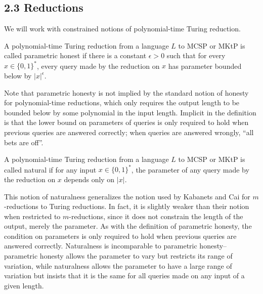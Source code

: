 \subsection*{2.3 Reductions}
We will work with constrained notions of polynomial-time Turing reduction.
\begin{ntdefinition}
A polynomial-time Turing reduction from a language $L$ to MCSP or MKtP is called parametric honest if there is a constant $\epsilon>0$ such that for every $x\in\{0,1\}^*$, every query made by the reduction on $x$ has parameter bounded below by $|x|^\epsilon$.
\end{ntdefinition}
Note that parametric honesty is not implied by the standard notion of honesty for polynomial-time reductions, which only requires the output length to be bounded below by some polynomial in the input length. Implicit in the definition is that the lower bound on parameters of queries is only required to hold when previous queries are answered correctly; when queries are answered wrongly, ``all bets are off''.
\begin{ntdefinition}
A polynomial-time Turing reduction from a language $L$ to MCSP or MKtP is called natural if for any input $x\in\{0,1\}^*$, the parameter of any query made by the reduction on $x$ depends only on $|x|$.
\end{ntdefinition}
This notion of naturalness generalizes the notion used by Kabanets and Cai for $m$-reductions to Turing reductions. In fact, it is slightly weaker than their notion when restricted to $m$-reductions, since it does not constrain the length of the output, merely the parameter. As with the definition of parametric honesty, the condition on parameters is only required to hold when previous queries are answered correctly.
Naturalness is incomparable to parametric honesty--parametric honesty allows the parameter to vary but restricts its range of variation, while naturalness allows the parameter to have a large range of variation but insists that it is the same for all queries made on any input of a given length.

